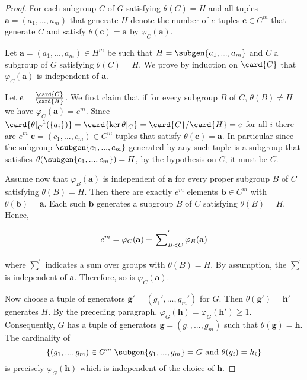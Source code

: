 \begin{proof}
    For each subgroup $C$ of $G$ satisfying $\theta(C) = H$ and all tuples $\mathbf{a} = (a_1,...,a_m)$ that generate $H$ denote the number of $e$-tuples $\mathbf{c} \in C^m$ that generate $C$ and satisfy $\theta(\mathbf{c}) = \mathbf{a}$ by $\varphi_C(\mathbf{a})$. 
    
    Let $\mathbf{a} = (a_1,...,a_m) \in H^m$ be such that $H = \subgen{a_1, ..., a_m}$ and $C$ a subgroup of $G$ satisfying $\theta(C) = H$.
    We prove by induction on $\card{C}$ that $\varphi_C(\mathbf{a})$ is independent of $\mathbf{a}$.

    Let $e = \frac{\card{C}}{\card{H}}$.
    We first claim that if for every subgroup $B$ of $C$, $\theta(B) \ne H$ we have $\varphi_C(\mathbf{a}) = e^m$. Since $\card{\theta|_{C}^{-1}(\{a_i\})} = \card{\ker \theta|_{C}} = \card{C}/\card{H} = e$ for all $i$ there are $e^m$ $\mathbf{c} = (c_1, ..., c_m) \in C^m$ tuples that satisfy $\theta(\mathbf{c}) = \mathbf{a}$. In particular since the subgroup $\subgen{c_1, ..., c_m}$ generated by any such tuple is a subgroup that satisfies $\theta(\subgen{c_1, ..., c_m}) = H$, by the hypothesis on $C$, it must be $C$. 
    
    Assume now that $\varphi_B(\mathbf{a})$ is independent of $\mathbf{a}$ for every proper subgroup $B$ of $C$ satisfying $\theta(B) = H$. Then there are exactly $e^m$ elements $\mathbf{b} \in C^m$ with $\theta(\mathbf{b}) = \mathbf{a}$. Each such $\mathbf{b}$ generates a subgroup $B$ of $C$ satisfying $\theta(B) = H$. Hence,
    $$
    e^m = \varphi_C(\mathbf{a}) + \sideset{}{}{\sum_{B < C}^{'}} \varphi_B(\mathbf{a})
    $$
    where $\sum_{}^{'}$ indicates a sum over groups with $\theta(B) = H$. By assumption, the $\sum_{}^{'}$ is independent of $\mathbf{a}$. Therefore, so is $\varphi_C(\mathbf{a})$.

    Now choose a tuple of generators $\mathbf{g'} = (g_1', ..., g_m')$ for $G$. 
    Then $\theta(\mathbf{g'}) = \mathbf{h'}$ generates $H$. By the preceding paragraph, $\varphi_G(\mathbf{h}) = \varphi_G(\mathbf{h'}) \ge 1$. 
    Consequently, $G$ has a tuple of generators $\mathbf{g} =(g_1, ..., g_m)$ such that $\theta(\mathbf{g}) = \mathbf{h}$. 
    The cardinality of 
    $$
    \left\{(g_1,...,g_m) \in G^m |\subgen{g_1,...,g_m} = G \text{ and } \theta(g_i) = h_i \right\}
    $$ 
    is precisely $\varphi_G(\mathbf{h})$ which is independent of the choice of $\mathbf{h}$.
\end{proof}

